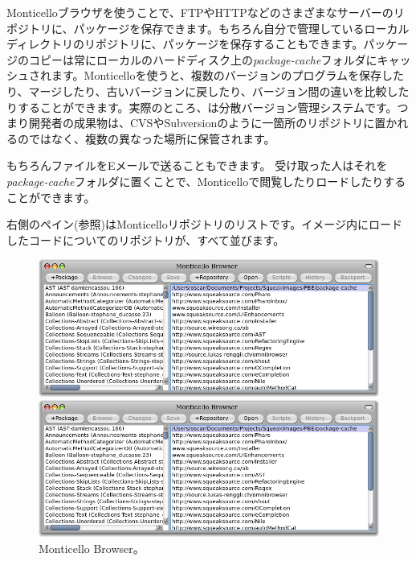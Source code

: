 \documentclass[a4paper,10pt,twoside]{book}
\begin{document}
Monticelloブラウザを使うことで、FTPやHTTPなどのさまざまなサーバーのリポジトリに、パッケージを保存できます。もちろん自分で管理しているローカルディレクトリのリポジトリに、パッケージを保存することもできます。パッケージのコピーは常にローカルのハードディスク上の\emph{package-cache}フォルダにキャッシュされます。Monticelloを使うと、複数のバージョンのプログラムを保存したり、マージしたり、古いバージョンに戻したり、バージョン間の違いを比較したりすることができます。実際のところ、は分散バージョン管理システムです。つまり開発者の成果物は、CVSやSubversionのように一箇所のリポジトリに置かれるのではなく、複数の異なった場所に保管されます。

もちろんファイルをEメールで送ることもできます。
受け取った人はそれを\emph{package-cache}フォルダに置くことで、Monticelloで閲覧したりロードしたりすることができます。

右側のペイン(参照)はMonticelloリポジトリのリストです。イメージ内にロードしたコードについてのリポジトリが、すべて並びます。


\begin{figure}[hbt]
\ifluluelse
	{\centerline {\includegraphics[width=\textwidth]{MonticelloBrowser}}}
	{\centerline {\includegraphics[scale=0.7]{MonticelloBrowser}}}
\caption{Monticello Browser。
}
\end{figure}
\end{document}
